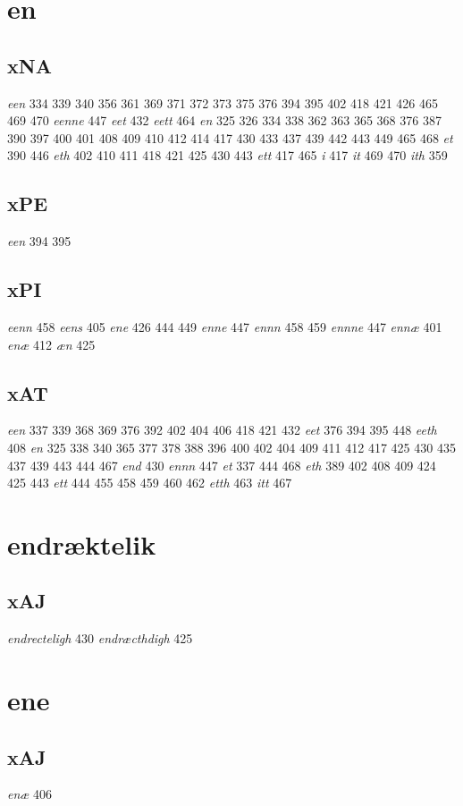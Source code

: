 \documentclass[a4paper,twocolumn]{article}
\begin{document}
\section{en}
\label{sec:org0b6778f}
\subsection{xNA}
\label{sec:org6dea999}
\emph{een} 334 339 340 356 361 369 371 372 373 375 376 394 395 402 418 421 426 465 469 470 \emph{eenne} 447 \emph{eet} 432 \emph{eett} 464 \emph{en} 325 326 334 338 362 363 365 368 376 387 390 397 400 401 408 409 410 412 414 417 430 433 437 439 442 443 449 465 468 \emph{et} 390 446 \emph{eth} 402 410 411 418 421 425 430 443 \emph{ett} 417 465 \emph{i} 417 \emph{it} 469 470 \emph{ith} 359 
\subsection{xPE}
\label{sec:org4328b4a}
\emph{een} 394 395 
\subsection{xPI}
\label{sec:orga49e248}
\emph{eenn} 458 \emph{eens} 405 \emph{ene} 426 444 449 \emph{enne} 447 \emph{ennn} 458 459 \emph{ennne} 447 \emph{ennæ} 401 \emph{enæ} 412 \emph{æn} 425 
\subsection{xAT}
\label{sec:org9d592e0}
\emph{een} 337 339 368 369 376 392 402 404 406 418 421 432 \emph{eet} 376 394 395 448 \emph{eeth} 408 \emph{en} 325 338 340 365 377 378 388 396 400 402 404 409 411 412 417 425 430 435 437 439 443 444 467 \emph{end} 430 \emph{ennn} 447 \emph{et} 337 444 468 \emph{eth} 389 402 408 409 424 425 443 \emph{ett} 444 455 458 459 460 462 \emph{etth} 463 \emph{itt} 467 
\section{endræktelik}
\label{sec:org777a7f6}
\subsection{xAJ}
\label{sec:orge9464bc}
\emph{endrecteligh} 430 \emph{endræcthdigh} 425 
\section{ene}
\label{sec:org078043a}
\subsection{xAJ}
\label{sec:org2a488ad}
\emph{enæ} 406 
\end{document}
